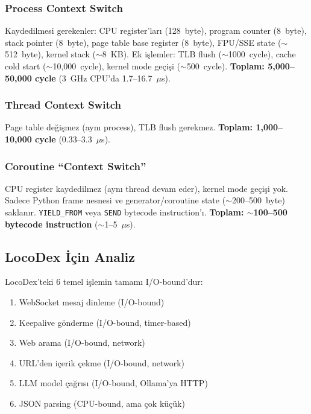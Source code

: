 \subsubsection{Process Context Switch}
Kaydedilmesi gerekenler: CPU register'lar{\i} (128~byte), program counter (8~byte), stack pointer (8~byte), page table base register (8~byte), FPU/SSE state ($\sim$512~byte), kernel stack ($\sim$8~KB). Ek i\c{s}lemler: TLB flush ($\sim$1000~cycle), cache cold start ($\sim$10{,}000~cycle), kernel mode ge\c{c}i\c{s}i ($\sim$500~cycle). \textbf{Toplam: 5{,}000--50{,}000 cycle} (3~GHz CPU'da 1.7--16.7~$\mu$s).

\subsubsection{Thread Context Switch}
Page table de\u{g}i\c{s}mez (ayn{\i} process), TLB flush gerekmez. \textbf{Toplam: 1{,}000--10{,}000 cycle} (0.33--3.3~$\mu$s).

\subsubsection{Coroutine ``Context Switch''}
CPU register kaydedilmez (ayn{\i} thread devam eder), kernel mode ge\c{c}i\c{s}i yok. Sadece Python frame nesnesi ve generator/coroutine state ($\sim$200--500~byte) saklan{\i}r. \texttt{YIELD\_FROM} veya \texttt{SEND} bytecode instruction'{\i}. \textbf{Toplam: $\sim$100--500 bytecode instruction} ($\sim$1--5~$\mu$s).

\subsection{LocoDex \.{I}\c{c}in Analiz}
\label{sec:locodex-concurrency}

LocoDex'teki 6 temel i\c{s}lemin tamam{\i} I/O-bound'dur:

\begin{enumerate}
  \item WebSocket mesaj dinleme (I/O-bound)
  \item Keepalive g\"{o}nderme (I/O-bound, timer-based)
  \item Web arama (I/O-bound, network)
  \item URL'den i\c{c}erik \c{c}ekme (I/O-bound, network)
  \item LLM model \c{c}a\u{g}r{\i}s{\i} (I/O-bound, Ollama'ya HTTP)
  \item JSON parsing (CPU-bound, ama \c{c}ok k\"{u}\c{c}\"{u}k)
\end{enumerate}


